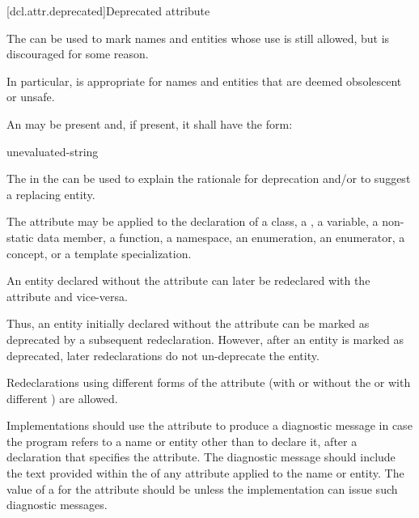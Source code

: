 [dcl.attr.deprecated]{Deprecated attribute}%

\pnum
The   can be used to mark names and entities
whose use is still allowed, but is discouraged for some reason.
\begin{note}
In particular,
 is appropriate for names and entities that are deemed obsolescent or
unsafe.
\end{note}
An
 may be present and, if present, it shall have the form:
\begin{ncbnf}
\terminal{(} unevaluated-string \terminal{)}
\end{ncbnf}
\begin{note}
The  in the 
can be used to explain the rationale for deprecation and/or to suggest a replacing entity.
\end{note}

\pnum
The attribute may be applied to the declaration of
a class,
a ,
a variable,
a non-static data member,
a function,
a namespace,
an enumeration,
an enumerator,
a concept, or
a template specialization.

\pnum
An entity declared without the  attribute can later be redeclared
with the attribute and vice-versa.
\begin{note}
Thus, an entity initially declared without the
attribute can be marked as deprecated by a subsequent redeclaration. However, after an entity
is marked as deprecated, later redeclarations do not un-deprecate the entity.
\end{note}
Redeclarations using different forms of the attribute (with or without the
 or with different
) are allowed.

\pnum
\recommended
Implementations should use the  attribute to produce a diagnostic
message in case the program refers to a name or entity other than to declare it, after a
declaration that specifies the attribute. The diagnostic message should include the text provided
within the  of any  attribute applied
to the name or entity.
The value of
a  for the  attribute
should be 
unless the implementation can issue such diagnostic messages.

